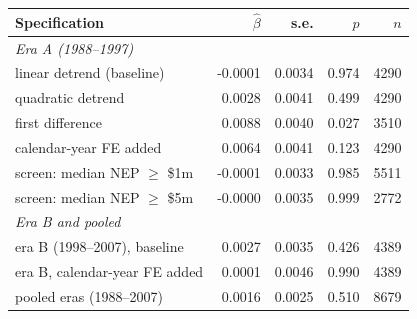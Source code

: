 \begin{tabular}{lrrrr}
\toprule
Specification & $\hat\beta$ & s.e. & $p$ & $n$ \\
\midrule
\multicolumn{5}{l}{\emph{Era A (1988--1997)}} \\
\quad linear detrend (baseline) & -0.0001 & 0.0034 & 0.974 & 4290 \\
\quad quadratic detrend & 0.0028 & 0.0041 & 0.499 & 4290 \\
\quad first difference & 0.0088 & 0.0040 & 0.027 & 3510 \\
\quad calendar-year FE added & 0.0064 & 0.0041 & 0.123 & 4290 \\
\quad screen: median NEP $\geq$ \$1m & -0.0001 & 0.0033 & 0.985 & 5511 \\
\quad screen: median NEP $\geq$ \$5m & -0.0000 & 0.0035 & 0.999 & 2772 \\
\midrule
\multicolumn{5}{l}{\emph{Era B and pooled}} \\
\quad era B (1998--2007), baseline & 0.0027 & 0.0035 & 0.426 & 4389 \\
\quad era B, calendar-year FE added & 0.0001 & 0.0046 & 0.990 & 4389 \\
\quad pooled eras (1988--2007) & 0.0016 & 0.0025 & 0.510 & 8679 \\
\bottomrule
\end{tabular}

